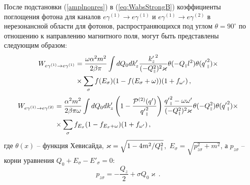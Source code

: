 После подстановки (\ref{amplnonres}) в
(\ref{eq:WabsStrongB}) коэффициенты поглощения фотона для каналов $e\gamma^{(1)}\to e\gamma^{(1)}$ и $e\gamma^{(1)}\to e\gamma^{(2)}$ в нерезонансной области для фотонов, распространяющихся под углом $\theta=90^\circ$ по отношению к направлению магнитного поля,  могут быть представлены следующим образом:
\begin{equation}\label{Wnonres}\begin{aligned}
		W_{e\gamma^{(1)}\to e\gamma^{(1)}}&=\frac{\omega \alpha^2m^2}{2 \beta \pi}\int dQ_0 dk_z' \frac{{k_z'}^2}{(-Q_{\mbox{\tiny $\|$}}^2)^2\varkappa}\theta(-Q_{\mbox{\tiny $\|$}}l^2)
		\theta({q'}_{\mbox{\tiny $\|$}}^2)\times\\&\times \sum_{\sigma} f(E_\sigma)(1-f(E_\sigma+\omega))(1+f_{\omega'})\, ,
\end{aligned}\end{equation}
\begin{equation}
	\begin{aligned}\label{Wnonres2}
		W_{e\gamma^{(1)}\to e\gamma^{(2)}}&=\frac{ \alpha^2m^2}{2 \beta \pi \omega}\int dQ_0 dk_z'\left(1-\frac{{\cal P}^{(2)}(q')}{{q'}_{\mbox{\tiny $\|$}}^2}\right) \frac{{q'}_{\mbox{\tiny $\|$}}^2-\omega\omega'}{(-Q_{\mbox{\tiny $\|$}}^2)^2\varkappa}\theta(-Q_{\mbox{\tiny $\|$}}^2)
		\theta({q'}_{\mbox{\tiny $\|$}}^2)\times\\ &\times\sum_{\sigma} f_{E_\sigma}(1-f_{E_\sigma+\omega})(1+f_{\omega'})\, ,
	\end{aligned}
\end{equation}
\noindent где $\theta(x)$ -- функция Хевисайда,
\mbox{$\varkappa = \sqrt{1 - 4m^2/Q^2_{\mbox{\tiny $\|$}}}$, $E_\sigma=\sqrt{p_{z\sigma}^2+m^2}$}, а \linebreak $p_{z\sigma}$ -- корни уравнения $Q_0+E_\sigma-E'_\sigma=0$:
\begin{equation}\label{savelaw}
	p_{z\sigma}=-\frac{Q_z}{2}+ \sigma Q_0 \varkappa\, .
\end{equation} 

